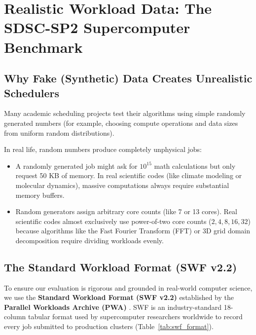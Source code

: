 \documentclass[11pt,a4paper]{article}
\begin{document}
\section{Realistic Workload Data: The SDSC-SP2 Supercomputer Benchmark}

\subsection{Why Fake (Synthetic) Data Creates Unrealistic Schedulers}
Many academic scheduling projects test their algorithms using simple randomly generated numbers (for example, choosing compute operations and data sizes from uniform random distributions). 

In real life, random numbers produce completely unphysical jobs:
\begin{itemize}[noitemsep, topsep=1pt]
    \item A randomly generated job might ask for $10^{15}$ math calculations but only request 50 KB of memory. In real scientific codes (like climate modeling or molecular dynamics), massive computations always require substantial memory buffers.
    \item Random generators assign arbitrary core counts (like 7 or 13 cores). Real scientific codes almost exclusively use power-of-two core counts ($2, 4, 8, 16, 32$) because algorithms like the Fast Fourier Transform (FFT) or 3D grid domain decomposition require dividing workloads evenly.
\end{itemize}

\subsection{The Standard Workload Format (SWF v2.2)}
To ensure our evaluation is rigorous and grounded in real-world computer science, we use the \textbf{Standard Workload Format (SWF v2.2)} established by the \textbf{Parallel Workloads Archive (PWA)} \cite{feitelson2014pwa, talby1999swf}. SWF is an industry-standard 18-column tabular format used by supercomputer researchers worldwide to record every job submitted to production clusters (Table~\ref{tab:swf_format}).
\end{document}
